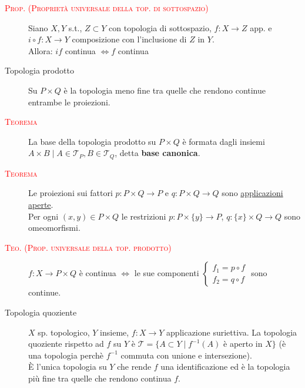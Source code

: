 \documentclass[a4paper,10pt]{article}
\newcommand{\myth}{\normalfont \scshape \textcolor{red}}
\theoremstyle{remark}
\theoremstyle{definition}
\begin{document}
\begin{description}
    \item[\myth{Prop. (Proprietà universale della top. di sottospazio)}] Siano $X, Y$ s.t., $Z\subset Y$ con topologia di sottospazio, $f: X \to Z$ app. e $i \circ f:X \to Y$ composizione con l'inclusione di $Z$ in $Y$.\\
    Allora: $if$ continua $\iff f$ continua

    \item[Topologia prodotto] Su $P \times Q$ è la topologia meno fine tra quelle che rendono continue entrambe le proiezioni. 
    
    \item[\myth{Teorema}] La base della topologia prodotto su $P\times Q$ è formata dagli insiemi $A \times B \mid A \in \mathcal{T}_P, B \in \mathcal{T}_Q$, detta \textbf{base canonica}.

     \item[\myth{Teorema}] Le proiezioni sui fattori $p: P\times Q \to P$ e $q: P\times Q \to Q$ sono \underline{applicazioni aperte}. \\
     Per ogni $(x,y) \in P \times Q$ le restrizioni $p: P\times \{y\} \to P$,  $q: \{x\} \times Q \to Q$ sono omeomorfismi.

    \item[\myth{Teo. (Prop. universale della top. prodotto)}] $f: X \to P \times Q$ è continua $\iff$ le sue componenti 
     $\begin{cases}
        f_1=p \circ f \\
         f_2=q \circ f 
    \end{cases}$
     sono continue.

    \item[Topologia quoziente] $X$ sp. topologico, $Y$ insieme, $f: X \rightarrow Y$ applicazione suriettiva. La topologia quoziente rispetto ad $f$ su $Y$ è $\mathcal{T}= \{A \subset Y\mid f^{-1}(A)$ è aperto in $X \}$ (è una topologia perchè $f^{-1}$ commuta con unione e intersezione). \\
    È l'unica topologia su $Y$ che rende $f$ una identificazione ed è la topologia più fine tra quelle che rendono continua $f$.
    

\end{description}
\end{document}

